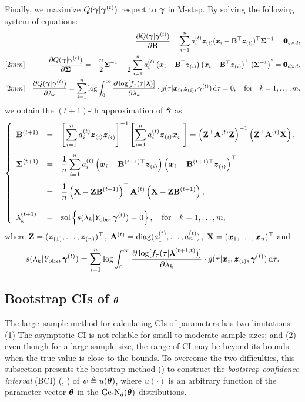Finally, we maximize $Q(\bga | \bgat)$ respect to $\bga$ in M-step. By solving the following system of equations:
\begin{eqnarray*}
    && \frac{\pa Q(\bga | \bgat)}{\pa \bB} = \sum_{i=1}^n \at{i} \ibzi (\ibx_i - \bB^\top \ibzi)^\top \bSi^{-1} = \0_{q\times d}, \\ [2mm]
    && \frac{\pa Q(\bga | \bgat)}{\pa \bSi} = -\frac{n}{2} \bSi^{-1} + \frac{1}{2} \sum_{i=1}^n \at{i} \left(\ibx_i - \bB^\top \ibzi \right) \left(\ibx_i - \bB^\top \ibzi \right)^\top \left( \bSi^{-1} \right)^2 = \0_{d \times d}, \\ [2mm]
    && \frac{\pa Q(\bga | \bgat)}{\pa \la_k} = \sum_{i=1}^n \log \int_0^\infty \frac{\pa \log[f_\tau(\tau|\bla)]}{\pa \la_k} \cdot g(\tau | \ibx_i, \ibzi, \bgat) \rd \tau = 0, \qfor k = 1, \dots, m.
\end{eqnarray*}
we obtain the $(t+1)$-th approximation of $\hbga$ as
\begin{eqnarray}    \label{zyf.four.2.11}
    \left\{
    \begin{array}{lll}
        \bBtI &=& \dis \left[ \sum_{i=1}^n \at{i} \ibzi \ibziT \right]^{-1} \left[ \sum_{i=1}^n \at{i} \ibzi \ibx_i^\top \right] = \left(\bZ^\top \At{} \bZ\right)^{-1} \left(\bZ^\top \At{} \bX\right), \\ [6mm]
        \bSitI &=& \dis \frac{1}{n} \sum_{i=1}^n \at{i} \left( \ibx_i - \bB^{(t+1)\top} \ibzi\right) \left( \ibx_i - \bB^{(t+1)\top}\ibzi \right)^\top \\ [6mm]
        &=& \dis \frac{1}{n}\left(\bX - \bZ \bBtI \right)^\top \At{} \left(\bX - \bZ \bBtI \right), \\ [6mm]
        \latI_k &=& \dis \sol\left\{ s(\la_k | \Y{obs}, \bgat) = 0 \right\}, \qfor k = 1, \dots, m,
    \end{array}
    \right.
\end{eqnarray}
where $\bZ = (\ibz_{(1)}, \dots, \ibz_{(n)})^\top$, $\At{} = \diag(\at{1}, \dots, \at{n})$, $\bX = (\ibx_1, \dots, \ibx_n)^\top$ and 
$$
    s(\la_k | \Y{obs}, \bgat) = \sum_{i=1}^n \log \int_0^\infty \frac{\pa \log[f_\tau(\tau|\bla^{(t+1,t)})]}{\pa \la_k} \cdot g(\tau | \ibx_i, \ibzi, \bgat) \rd \tau.
$$

\subsection{Bootstrap CIs of $\bth$}     %

The large--sample method for calculating CIs of parameters has two limitations: (1) The asymptotic CI is not reliable for small to moderate sample sizes; and (2) even though for a large sample size, the range of CI may be beyond its bounds when the true value is close to the bounds. To overcome the two difficulties, this subsection presents the bootstrap method (\cite{Efron1992}) to construct the \textit{bootstrap confidence interval} (BCI) (\cite{Hall1988}, \cite{DR1988}) of $\psi \teq u(\bth)$, where $u(\cdot)$ is an arbitrary function of the parameter vector $\bth$ in the $\mbox{Ge-N}_d(\bth)$ distributions.

